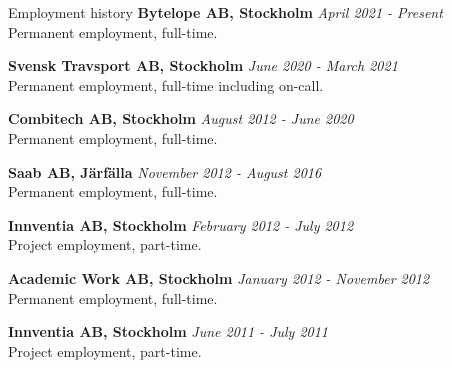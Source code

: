 \documentclass{resume}
\begin{document}
  \newpage
  \begin{rSection}{Employment history}
  	{\bf Bytelope AB, Stockholm}
    \hfill {\em April 2021 - Present } \\
    { Permanent employment, full-time. }
    
  	{\bf Svensk Travsport AB, Stockholm}
    \hfill {\em June 2020 - March 2021 } \\
    { Permanent employment, full-time including on-call. }

    {\bf Combitech AB, Stockholm}
    \hfill {\em August 2012 - June 2020 } \\
    { Permanent employment, full-time. }

    {\bf Saab AB, Järfälla}
    \hfill {\em November 2012 - August 2016 } \\
    { Permanent employment, full-time. }

    {\bf Innventia AB, Stockholm}
    \hfill {\em February 2012 - July 2012 } \\
    { Project employment, part-time. }

    {\bf Academic Work AB, Stockholm}
    \hfill {\em January 2012 - November 2012 } \\
    { Permanent employment, full-time. }

    {\bf Innventia AB, Stockholm}
    \hfill {\em June 2011 - July 2011 } \\
    { Project employment, part-time. }
  \end{rSection}
\end{document}
